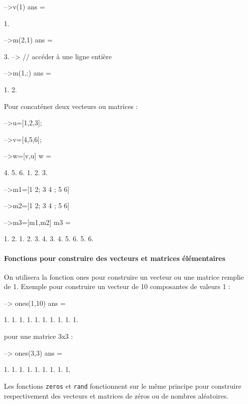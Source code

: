\begin{Scilabcode}
-->v(1)
 ans  =
 
    1.  

-->m(2,1)
 ans  =
 
    3.  
--> // accéder à une ligne entière
 
-->m(1,:)
 ans  =
   
     1.    2. 
\end{Scilabcode}
Pour concaténer deux vecteurs ou matrices :
\begin{Scilabcode}
-->u=[1,2,3];
 
-->v=[4,5,6];
 
-->w=[v,u]
 w  =
 
    4.    5.    6.    1.    2.    3.

-->m1=[1 2; 3 4 ; 5 6]
 
-->m2=[1 2; 3 4 ; 5 6]
 
-->m3=[m1,m2]
 m3  =
 
    1.    2.    1.    2.  
    3.    4.    3.    4.  
    5.    6.    5.    6. 
\end{Scilabcode}
\paragraph{Fonctions pour construire des vecteurs et matrices élémentaires}
On utilisera la fonction ones pour construire un vecteur ou une matrice remplie 
de 1.
Exemple pour construire un vecteur de 10 composantes de valeurs 1 :
\begin{Scilabcode}
--> ones(1,10)
 ans  =

    1.   1.   1.   1.   1.   1.   1.   1.   1.   1.

\end{Scilabcode}
pour une matrice 3x3 :
\begin{Scilabcode}
--> ones(3,3)
 ans  =

    1.   1.   1.
    1.   1.   1.
    1.   1.   1.
\end{Scilabcode}
Les fonctions \verb?zeros? et \verb?rand? fonctionnent sur le même principe 
pour construire respectivement des vecteurs et matrices de zéros ou de nombres 
aléatoires.

